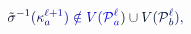 \documentclass[12pt]{article}
\begin{document}
\makeatletter
\renewcommand*{\@textcolor}[3]{%
  \protect\leavevmode
  \begingroup
    \color#1{#2}#3%
  \endgroup
}
\makeatother
\begin{displaymath}
\mathcolor[RGB]{0,0,15}{\Tilde { \mathcolor[RGB]{0,0,30}{\sigma} } } ^ { \mathcolor[RGB]{0,0,45}{-} \mathcolor[RGB]{0,0,60}{1} } \mathcolor[RGB]{0,0,75}{(} \mathcolor[RGB]{0,0,90}{\kappa} _ { \mathcolor[RGB]{0,0,105}{a} } ^ { \mathcolor[RGB]{0,0,120}{\ell} \mathcolor[RGB]{0,0,135}{+} \mathcolor[RGB]{0,0,150}{1} } \mathcolor[RGB]{0,0,165}{)} \mathcolor[RGB]{0,0,180}{\notin} \mathcolor[RGB]{0,0,195}{V} \mathcolor[RGB]{0,0,210}{(} \mathcal { \mathcolor[RGB]{0,0,225}{P} } _ { \mathcolor[RGB]{0,0,240}{a} } ^ { \mathcolor[RGB]{0,0,255}{\ell} } \mathcolor[RGB]{0,15,0}{)} \mathcolor[RGB]{0,15,15}{\cup} \mathcolor[RGB]{0,15,30}{V} \mathcolor[RGB]{0,15,45}{(} \mathcal { \mathcolor[RGB]{0,15,60}{P} } _ { \mathcolor[RGB]{0,15,75}{b} } ^ { \mathcolor[RGB]{0,15,90}{\ell} } \mathcolor[RGB]{0,15,105}{)} \mathcolor[RGB]{0,15,120}{,}
\end{displaymath}
\end{document}
